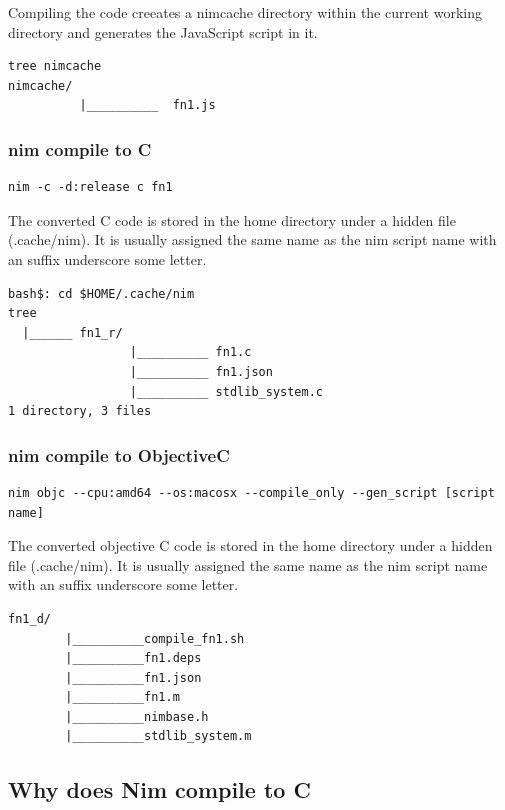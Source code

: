 \documentclass[10pt, a4paper, twocolumn]{article} %
\begin{document}
Compiling the code creeates a nimcache directory within the current working directory and generates the JavaScript script in it.

\begin{lstlisting}
tree nimcache
nimcache/
		  |__________  fn1.js
\end{lstlisting}

\subsubsection{nim compile to C}



\begin{lstlisting}
nim -c -d:release c fn1
\end{lstlisting}

The converted C code is stored in the home directory under a hidden file (.cache/nim). It is usually assigned the same name as the nim script name with an suffix underscore some letter.

\begin{lstlisting}
bash$: cd $HOME/.cache/nim
tree 
  |______ fn1_r/
    	     	 |__________ fn1.c
		 		 |__________ fn1.json
		 		 |__________ stdlib_system.c
1 directory, 3 files
\end{lstlisting}

\subsubsection{nim compile to ObjectiveC}

\begin{lstlisting}
nim objc --cpu:amd64 --os:macosx --compile_only --gen_script [script name] 
\end{lstlisting}

The converted objective C code is stored in the home directory under a hidden file (.cache/nim). It is usually assigned the same name as the nim script name with an suffix underscore some letter.

\begin{lstlisting}
fn1_d/
		|__________compile_fn1.sh
		|__________fn1.deps
		|__________fn1.json
		|__________fn1.m
		|__________nimbase.h
		|__________stdlib_system.m
\end{lstlisting}

\subsection{Why does Nim compile to C}
\end{document}
